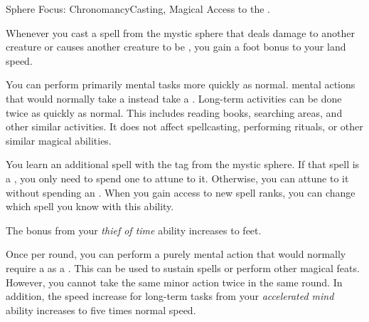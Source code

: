     \begin{feat}{Sphere Focus: Chronomancy}{Casting, Magical}
        \featpre Access to the  .

         Whenever you cast a spell from the  mystic sphere that deals damage to another creature or causes another creature to be \slowed, you  gain a  foot bonus to your land speed.

         You can perform primarily mental tasks more quickly as normal.
         mental actions that would normally take a  instead take a .
        Long-term activities can be done twice as quickly as normal.
        This includes reading books, searching areas, and other similar activities.
        It does not affect spellcasting, performing rituals, or other similar magical abilities.

         You learn an additional spell with the  tag from the  mystic sphere.
        If that spell is a , you only need to spend one  to attune to it.
        Otherwise, you can attune to it without spending an .
        When you gain access to new spell ranks, you can change which spell you know with this ability.

         The bonus from your \textit{thief of time} ability increases to  feet.

         Once per round, you can perform a purely mental action that would normally require a  as a .
        This can be used to sustain spells or perform other magical feats.
        However, you cannot take the same minor action twice in the same round.
        In addition, the speed increase for long-term tasks from your \textit{accelerated mind} ability increases to five times normal speed.
    \end{feat}

